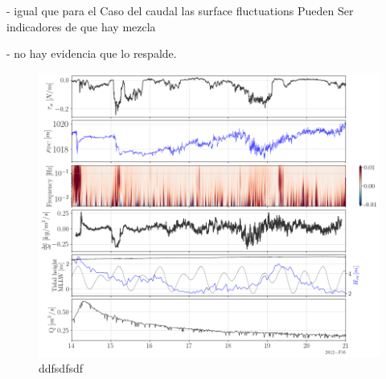 \documentclass[tesis.tex]{subfiles}
\begin{document}
- igual que para el Caso del caudal las surface fluctuations Pueden Ser indicadores de que hay mezcla

- no hay evidencia que lo respalde.

\begin{figure}[h!]
    \centering
    \includegraphics[width=\textwidth]{Imagenes/mix_wo.png}
    \caption{ddfsdfsdf }
    \label{fig:mix_wo}
\end{figure}
\end{document}
